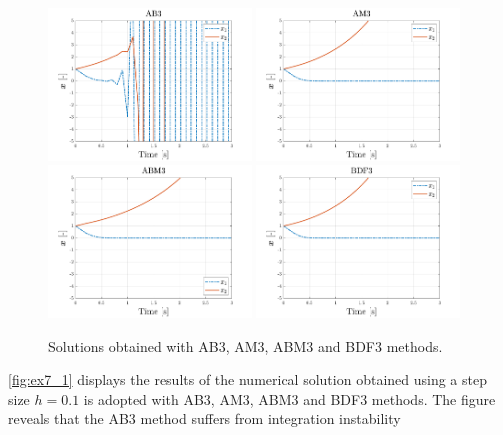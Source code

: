 \documentclass[11pt,a4paper,oneside]{article}
\begin{document}
\begin{figure}[h]
    \centering
    \includegraphics[width=0.48\textwidth]{gfx/ex7_1.pdf}
    \includegraphics[width=0.48\textwidth]{gfx/ex7_2.pdf}
    \includegraphics[width=0.48\textwidth]{gfx/ex7_3.pdf}
    \includegraphics[width=0.48\textwidth]{gfx/ex7_4.pdf}
    \caption{Solutions obtained with AB3, AM3, ABM3 and BDF3 methods.}
    \label{fig:ex7_1}
\end{figure}
\autoref{fig:ex7_1} displays the results of the numerical solution obtained using a step size $h=0.1$ is adopted with AB3, 
AM3, ABM3 and BDF3 methods. The figure reveals that the AB3 method suffers from integration instability 
\end{document}
